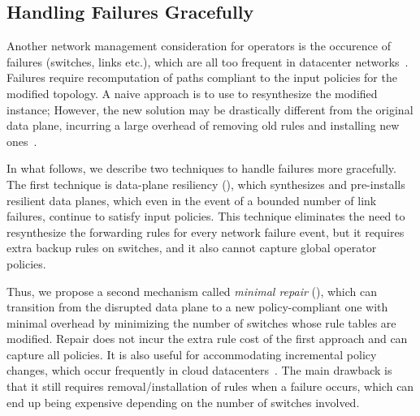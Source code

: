 \subsection{Handling Failures Gracefully}

Another network management consideration for operators is the
occurence of failures (switches, links etc.), which are all too
frequent in datacenter networks~\cite{datacenterfailures}. Failures require
recomputation of paths compliant to the input policies
for the modified topology.  A naive approach is to use \name to
resynthesize the modified instance; However, the new solution may be
drastically different from the original data plane, incurring a large
overhead of removing old rules and installing new
ones~\cite{sdnlatency,updatescheduling}. 


In what follows, we describe two techniques to handle failures more
gracefully. The first technique is data-plane resiliency (),
which synthesizes and
pre-installs resilient data planes, which even in the event of a
bounded number of link failures, continue to satisfy input
policies. This technique eliminates the need to resynthesize the
forwarding rules for every network failure event, but it 
requires extra backup rules on switches, and it also cannot
capture global operator policies.

Thus, we propose a second mechanism called \emph{minimal repair} (),
which can transition from the disrupted data
plane to a new policy-compliant one with minimal overhead
 by minimizing the number of
switches whose rule tables are modified. 
Repair does not incur the extra rule cost of the first approach 
and can capture all \Name policies. It is also useful for 
accommodating incremental policy changes, which occur frequently in
cloud datacenters~\cite{mpa-imc15}. The main drawback is that it still
requires removal/installation of rules when a failure occurs, which
can end up being expensive depending on the number of switches
involved.





